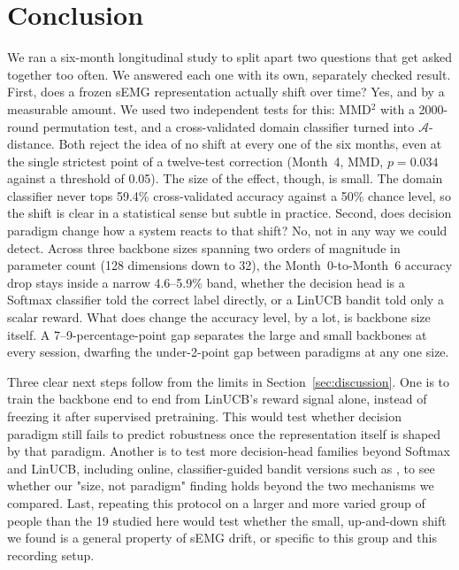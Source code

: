 \documentclass[journal]{IEEEtran}
\begin{document}
\section{Conclusion}
\label{sec:conclusion}

We ran a six-month longitudinal study to split apart two questions that get asked together too often. We answered each one with its own, separately checked result. First, does a frozen sEMG representation actually shift over time? Yes, and by a measurable amount. We used two independent tests for this: MMD$^2$ with a 2000-round permutation test, and a cross-validated domain classifier turned into $\mathcal{A}$-distance. Both reject the idea of no shift at every one of the six months, even at the single strictest point of a twelve-test correction (Month~4, MMD, $p=0.034$ against a threshold of 0.05). The size of the effect, though, is small. The domain classifier never tops 59.4\% cross-validated accuracy against a 50\% chance level, so the shift is clear in a statistical sense but subtle in practice. Second, does decision paradigm change how a system reacts to that shift? No, not in any way we could detect. Across three backbone sizes spanning two orders of magnitude in parameter count (128 dimensions down to 32), the Month~0-to-Month~6 accuracy drop stays inside a narrow 4.6--5.9\% band, whether the decision head is a Softmax classifier told the correct label directly, or a LinUCB bandit told only a scalar reward. What does change the accuracy level, by a lot, is backbone size itself. A 7--9-percentage-point gap separates the large and small backbones at every session, dwarfing the under-2-point gap between paradigms at any one size.

Three clear next steps follow from the limits in Section~\ref{sec:discussion}. One is to train the backbone end to end from LinUCB's reward signal alone, instead of freezing it after supervised pretraining. This would test whether decision paradigm still fails to predict robustness once the representation itself is shaped by that paradigm. Another is to test more decision-head families beyond Softmax and LinUCB, including online, classifier-guided bandit versions such as \cite{LinPaskettYang2025}, to see whether our "size, not paradigm" finding holds beyond the two mechanisms we compared. Last, repeating this protocol on a larger and more varied group of people than the 19 studied here would test whether the small, up-and-down shift we found is a general property of sEMG drift, or specific to this group and this recording setup.
\end{document}
